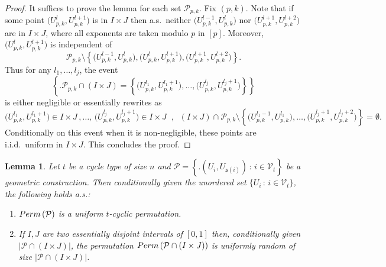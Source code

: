 \documentclass{article}
\newtheorem{lem}[theorem]{Lemma}
\theoremstyle{remark}
\newcommand{\card}[1]{\left|#1\right|}
\def\pts{\mathcal{P}}
\newcommand{\perm}[1]{{\rm Perm}\left(#1\right)}
\def\Vert{\mathcal{V}}
\def\s{\mathfrak{s}}
\begin{document}
\begin{proof}
    It suffices to prove the lemma for each set $\pts_{p,k}$.
    Fix $(p,k)$.
    Note that if some point $\big(U_{p,k}^l,U_{p,k}^{l+1}\big)$ is in $I\times J$ then a.s.~neither $\big(U_{p,k}^{l-1},U_{p,k}^{l}\big)$ nor $\big(U_{p,k}^{l+1},U_{p,k}^{l+2}\big)$ are in $I\times J$, where all exponents are taken modulo $p$ in $[p]$.
    Moreover, $\big(U_{p,k}^l,U_{p,k}^{l+1}\big)$ is independent of
    $$\pts_{p,k}\setminus\left\{ \big(U_{p,k}^{l-1},U_{p,k}^{l}\big) , \big(U_{p,k}^{l},U_{p,k}^{l+1}\big) , \big(U_{p,k}^{l+1},U_{p,k}^{l+2}\big) \right\} .$$
    Thus for any $l_1,\dots,l_j$, the event 
    \begin{equation*}
        \left\{\Bigg. \pts_{p,k}\cap(I\times J) = \left\{ \big(U_{p,k}^{l_1},U_{p,k}^{l_1+1}\big) ,\dots, \big(U_{p,k}^{l_j},U_{p,k}^{l_j+1}\big) \right\} \right\}
    \end{equation*}
    is either negligible or essentially rewrites as 
    \begin{equation*}
        \big(U_{p,k}^{l_1},U_{p,k}^{l_1+1}\big) \in I\!\times\! J
        \,,\dots,\, 
        \big(U_{p,k}^{l_j},U_{p,k}^{l_j+1}\big) \in I\!\times\! J
        \;\;,\;\;
        (I\!\times\! J)\cap\pts_{p,k}\setminus\left\{ \big(U_{p,k}^{l_1-1},U_{p,k}^{l_1}\big) ,\dots, \big(U_{p,k}^{l_j+1},U_{p,k}^{l_j+2}\big) \right\} = \emptyset .
    \end{equation*}
    Conditionally on this event when it is non-negligible, these points are i.i.d.~uniform in $I\times J$.
    This concludes the proof.
\end{proof}

\begin{lem}\label{lem: conditionally on coordinates}
    Let $t$ be a cycle type of size $n$ and $\pts = \left\{\big. (U_i,U_{\s(i)}) \,:\, i\in\Vert_t \right\}$ be a geometric construction.
    Then conditionally given the unordered set $\{U_i \,:\, i\in\Vert_t\}$, the following holds a.s.:
    \begin{enumerate}
        \item $\perm{\pts}$ is a uniform $t$-cyclic permutation.
        \item If $I,J$ are two essentially disjoint intervals of $[0,1]$ then, conditionally given $\card{\pts\cap(I\times J)}$, the permutation $\perm{\pts\cap(I\times J)}$ is uniformly random of size $\card{\pts\cap(I\times J)}$.
    \end{enumerate}
\end{lem}
\end{document}
